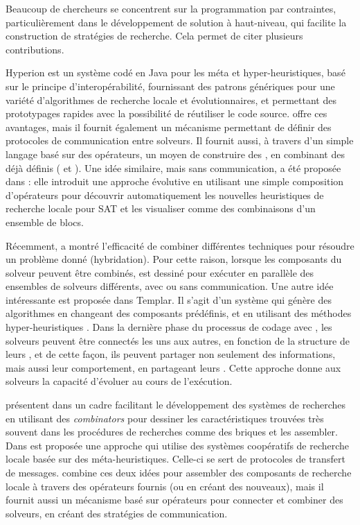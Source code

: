 Beaucoup de chercheurs se concentrent sur la programmation par contraintes, particuli\`erement dans le d\'eveloppement de solution \`a haut-niveau, qui facilite la construction de strat\'egies de recherche. Cela permet de citer plusieurs contributions. 

{\sc Hyperion} \cite{Brownlee2014} est un syst\`eme cod\'e en Java pour les m\'eta et hyper-heuristiques, bas\'e sur le principe d'interop\'erabilit\'e, fournissant des patrons g\'en\'eriques pour une vari\'et\'e d'algorithmes de recherche locale et \'evolutionnaires, et permettant des prototypages rapides avec la possibilit\'e de r\'eutiliser le code source. \posl{} offre ces avantages, mais il fournit \'egalement un m\'ecanisme permettant de d\'efinir des protocoles de communication entre solveurs. Il fournit aussi, \`a travers d'un simple langage bas\'e sur des op\'erateurs, un moyen de construire des \infr{\ass}, en combinant des \infr{\ms{}} d\'ej\`a d\'efinis (\infr{\oms{}} et \infr{\opchs}). Une id\'ee similaire, mais sans communication, a \'et\'e propos\'ee dans \cite{Fukunaga2008}: elle introduit une approche \'evolutive en utilisant une simple composition d'op\'erateurs pour d\'ecouvrir automatiquement les nouvelles heuristiques de recherche locale pour SAT et les visualiser comme des combinaisons d'un ensemble de blocs.

R\'ecemment, \cite{El-Ghazali2013} a montr\'e l'efficacit\'e de combiner diff\'erentes techniques pour r\'esoudre un probl\`eme donn\'e (hybridation). Pour cette raison, lorsque les composants du solveur peuvent \^etre combin\'es, \posl{} est dessin\'e pour ex\'ecuter en parall\`ele des ensembles de solveurs diff\'erents, avec ou sans communication. Une autre id\'ee int\'eressante est propos\'ee dans {\sc Templar}. Il s'agit d'un syst\`eme qui g\'en\`ere des algorithmes en changeant des composants pr\'ed\'efinis, et en utilisant des m\'ethodes hyper-heuristiques \cite{Swan2015}. Dans la derni\`ere phase du processus de codage avec \posl{}, les solveurs peuvent \^etre connect\'es les uns aux autres, en fonction de la structure de leurs \infr{\opchs}, et de cette fa\c{c}on, ils peuvent partager non seulement des informations, mais aussi leur comportement, en partageant leurs \infr{\oms}. Cette approche donne aux solveurs la capacit\'e d'\'evoluer au cours de l'ex\'ecution.

 pr\'esentent dans \cite{Landtsheer2015} un cadre facilitant le d\'eveloppement des syst\`emes de recherches en utilisant des \textit{combinators} pour dessiner les caract\'eristiques trouv\'ees tr\`es souvent dans les proc\'edures de recherches comme des briques et les assembler. Dans \cite{Martin2016} est propos\'ee une approche qui utilise des syst\`emes coop\'eratifs de recherche locale bas\'ee sur des m\'eta-heuristiques. Celle-ci se sert de protocoles de transfert de messages. \posl{} combine ces deux id\'ees pour assembler des composants de recherche locale \`a travers des op\'erateurs fournis (ou en cr\'eant des nouveaux), mais il fournit aussi un m\'ecanisme bas\'e sur op\'erateurs pour connecter et combiner des solveurs, en cr\'eant des strat\'egies de communication.

